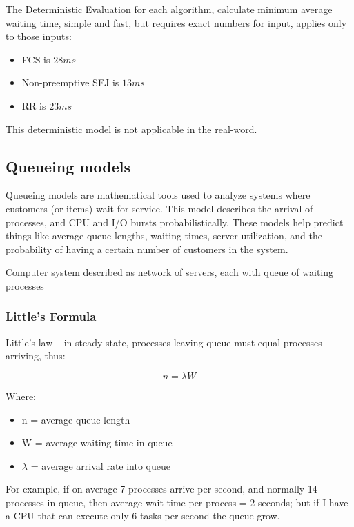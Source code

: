 The Deterministic Evaluation for each algorithm, calculate minimum average waiting time, simple and fast, but requires exact numbers for input, applies only to those inputs:

\begin{itemize}
    \item FCS is $28ms$
    \item Non-preemptive SFJ is $13ms$
    \item RR is $23ms$
\end{itemize}


 This deterministic model is not applicable in the real-word.

 \subsection{Queueing models}
Queueing models are mathematical tools used to analyze systems where customers (or items) wait for service. This model describes the arrival of processes, and CPU and I/O bursts probabilistically. These models help predict things like average queue lengths, waiting times, server utilization, and the probability of having a certain number of customers in the system.

Computer system described as network of servers, each with queue of waiting processes

\subsubsection{Little's Formula}

Little’s law – in steady state, processes leaving queue must
equal processes arriving, thus:

\begin{equation*}
    n = \lambda W
\end{equation*}

Where:

\begin{itemize}
    \item[] n = average queue length
    \item[] W = average waiting time in queue
    \item[] $\lambda$ = average arrival rate into queue
\end{itemize}

For example, if on average 7 processes arrive per second, and
normally 14 processes in queue, then average wait time per
process = 2 seconds; but if I have a CPU that can execute only 6 tasks per second the queue grow.


